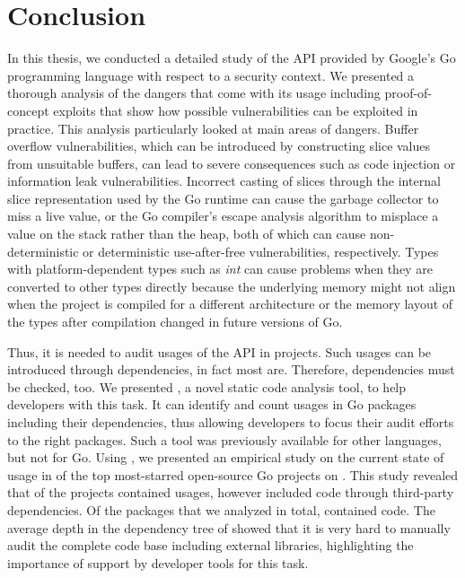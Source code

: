 \chapter{Conclusion}\label{ch:conclusion}

In this thesis, we conducted a detailed study of the \unsafe{} \acrshort{API} provided by Google's Go programming
language with respect to a security context.
We presented a thorough analysis of the dangers that come with its usage including proof-of-concept exploits that show
how possible vulnerabilities can be exploited in practice.
This analysis particularly looked at  main areas of dangers.
Buffer overflow vulnerabilities, which can be introduced by constructing slice values from unsuitable buffers, can lead
to severe consequences such as code injection or information leak vulnerabilities.
Incorrect casting of slices through the internal slice representation used by the Go runtime can cause the garbage
collector to miss a live value, or the Go compiler's escape analysis algorithm to misplace a value on the stack rather
than the heap, both of which can cause non-deterministic or deterministic use-after-free vulnerabilities, respectively.
Types with platform-dependent types such as \textit{int} can cause problems when they are converted to other types
directly because the underlying memory might not align when the project is compiled for a different architecture or
the memory layout of the types after compilation changed in future versions of Go.

Thus, it is needed to audit usages of the \unsafe{} API in projects.
Such usages can be introduced through dependencies, in fact most are.
Therefore, dependencies must be checked, too.
We presented \toolGeiger{}, a novel static code analysis tool, to help developers with this task.
It can identify and count \unsafe{} usages in Go packages including their dependencies, thus allowing developers to
focus their audit efforts to the right packages.
Such a tool was previously available for other languages, but not for Go.
Using \toolGeiger{}, we presented an empirical study on the current state of \unsafe{} usage in \projsAnalyzed{} of the
top \projsTotal{} most-starred open-source Go projects on \github{}.
This study revealed that \percentageUnsafeProjects{} of the projects contained \unsafe{} usages, however
\percentageUnsafeTransitiveWithDependencies{} included \unsafe{} code through third-party dependencies.
Of the \packagesAnalyzed{} packages that we analyzed in total, \percentageUnsafePackages{} contained \unsafe{} code.
The average depth in the dependency tree of \averageUnsafeImportDepth{} showed that it is very hard to manually audit
the complete code base including external libraries, highlighting the importance of support by developer tools for this
task.

